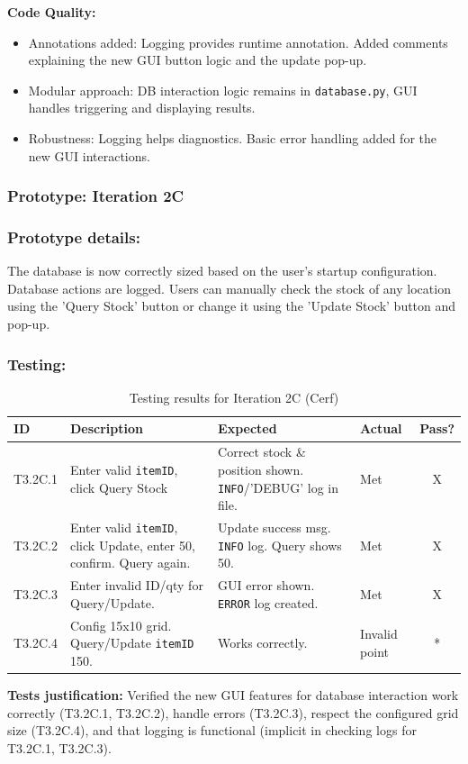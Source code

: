 \textbf{Code Quality:}
\begin{itemize}
	\item Annotations added: Logging provides runtime annotation. Added comments explaining the new GUI button logic and the update pop-up.
	\item Modular approach: DB interaction logic remains in \verb|database.py|, GUI handles triggering and displaying results.
	\item Robustness: Logging helps diagnostics. Basic error handling added for the new GUI interactions.
\end{itemize}

\newpage
\subsubsection*{Prototype: Iteration 2C}




\subsubsection{Prototype details:}
The database is now correctly sized based on the user's startup configuration. Database actions are logged. Users can manually check the stock of any location using the 'Query Stock' button or change it using the 'Update Stock' button and pop-up.

\subsubsection{Testing:}
\begin{table}[htbp]
	\centering
	\begin{tabularx}{\textwidth}{|l|X|p{4.5cm}|p{1.5cm}|c|}
		\hline
		\textbf{ID} & \textbf{Description} & \textbf{Expected} & \textbf{Actual} & \textbf{Pass?} \\
		\hline
		T3.2C.1 & Enter valid \verb|itemID|, click Query Stock & Correct stock \& position shown. \verb|INFO|/'DEBUG' log in file. & Met& X \\
		\hline
		T3.2C.2 & Enter valid \verb|itemID|, click Update, enter 50, confirm. Query again. & Update success msg. \verb|INFO| log. Query shows 50. & Met & X \\
		\hline
		T3.2C.3 & Enter invalid ID/qty for Query/Update. & GUI error shown. \verb|ERROR| log created. & Met & X \\
		\hline
		T3.2C.4 & Config 15x10 grid. Query/Update \verb|itemID| 150. & Works correctly. & Invalid point & * \\
		\hline
	\end{tabularx}
	\caption{Testing results for Iteration 2C (Cerf)}
\end{table}
\textbf{Tests justification:} Verified the new GUI features for database interaction work correctly (T3.2C.1, T3.2C.2), handle errors (T3.2C.3), respect the configured grid size (T3.2C.4), and that logging is functional (implicit in checking logs for T3.2C.1, T3.2C.3).

